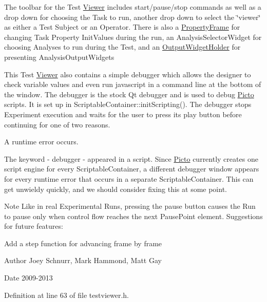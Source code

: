 The toolbar for the Test \hyperlink{class_viewer}{Viewer} includes start/pause/stop commands as well as a drop down for choosing the Task to run, another drop down to select the \char`\"{}viewer\char`\"{} as either a Test Subject or an Operator. There is also a \hyperlink{class_property_frame}{Property\-Frame} for changing Task Property Init\-Values during the run, an Analysis\-Selector\-Widget for choosing Analyses to run during the Test, and an \hyperlink{class_output_widget_holder}{Output\-Widget\-Holder} for presenting Analysis\-Output\-Widgets

This Test \hyperlink{class_viewer}{Viewer} also contains a simple debugger which allows the designer to check variable values and even run javascript in a command line at the bottom of the window. The debugger is the stock Qt debugger and is used to debug \hyperlink{namespace_picto}{Picto} scripts. It is set up in Scriptable\-Container\-::init\-Scripting(). The debugger stops Experiment execution and waits for the user to press its play button before continuing for one of two reasons.
\begin{DoxyItemize}
\item A runtime error occurs.
\item The keyword -\/ debugger -\/ appeared in a script. Since \hyperlink{namespace_picto}{Picto} currently creates one script engine for every Scriptable\-Container, a different debugger window appears for every runtime error that occurs in a separate Scriptable\-Container. This can get unwieldy quickly, and we should consider fixing this at some point.
\end{DoxyItemize}

\begin{DoxyNote}{Note}
Like in real Experimental Runs, pressing the pause button causes the Run to pause only when control flow reaches the next Pause\-Point element. Suggestions for future features\-:
\begin{DoxyItemize}
\item Add a step function for advancing frame by frame 
\end{DoxyItemize}
\end{DoxyNote}
\begin{DoxyAuthor}{Author}
Joey Schnurr, Mark Hammond, Matt Gay 
\end{DoxyAuthor}
\begin{DoxyDate}{Date}
2009-\/2013 
\end{DoxyDate}


Definition at line 63 of file testviewer.\-h.



